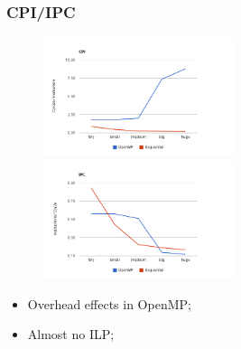 \documentclass{beamer}
\begin{document}
\begin{frame}
	\frametitle{CPI/IPC}

\begin{figure}
\begin{center}
\includegraphics[width=0.5\textwidth]{images/pfac/chrtcpi.png}
\includegraphics[width=0.5\textwidth]{images/pfac/chrtipc.png}
\end{center}
\end{figure}

\begin{itemize}
\item{Overhead effects in OpenMP;}
\item{Almost no ILP;}
\end{itemize}

\end{frame}
\end{document}
